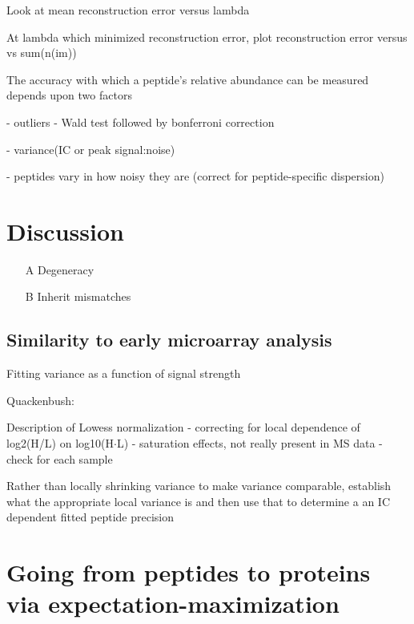 \documentclass[12pt]{article}
\begin{document}
\color{red}
Look at mean reconstruction error versus lambda

At lambda which minimized reconstruction error, plot reconstruction error versus vs sum(n(im))
\color{black}



The accuracy with which a peptide's relative abundance can be measured depends upon two factors

- outliers - Wald test followed by bonferroni correction

- variance(IC or peak signal:noise)

- peptides vary in how noisy they are (correct for peptide-specific dispersion)





\section*{Discussion}

\color{red}
\begin{itemize}
\item[A] Degeneracy
\item[B] Inherit mismatches
\end{itemize}
\color{black}

\subsection*{Similarity to early microarray analysis}

Fitting variance as a function of signal strength

Quackenbush:

Description of Lowess normalization - correcting for local dependence of log2(H/L) on log10(H$\cdot$L) - saturation effects, not really present in MS data - check for each sample

Rather than locally shrinking variance to make variance comparable, establish what the appropriate local variance is and then use that to determine a an IC dependent fitted peptide precision



\section*{Going from peptides to proteins via expectation-maximization}
\end{document}
